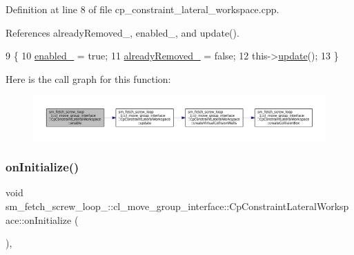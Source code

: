 Definition at line 8 of file cp\+\_\+constraint\+\_\+lateral\+\_\+workspace.\+cpp.



References already\+Removed\+\_\+, enabled\+\_\+, and update().


\begin{DoxyCode}
9         \{
10             \hyperlink{classsm__fetch__screw__loop__1_1_1cl__move__group__interface_1_1CpConstraintLateralWorkspace_a28b477967db7dd372abf9ab95675130e}{enabled\_} = \textcolor{keyword}{true};
11             \hyperlink{classsm__fetch__screw__loop__1_1_1cl__move__group__interface_1_1CpConstraintLateralWorkspace_a349bfead18a56cdbca6137926694e409}{alreadyRemoved\_} = \textcolor{keyword}{false};
12             this->\hyperlink{classsm__fetch__screw__loop__1_1_1cl__move__group__interface_1_1CpConstraintLateralWorkspace_a42a932b985fa0e4f9f48e52b363bf6c2}{update}();
13         \}
\end{DoxyCode}
Here is the call graph for this function\+:
\nopagebreak
\begin{figure}[H]
\begin{center}
\leavevmode
\includegraphics[width=350pt]{classsm__fetch__screw__loop__1_1_1cl__move__group__interface_1_1CpConstraintLateralWorkspace_a221dcce894e910dbfcbc58f80cacccdb_cgraph}
\end{center}
\end{figure}
\mbox{\label{classsm__fetch__screw__loop__1_1_1cl__move__group__interface_1_1CpConstraintLateralWorkspace_a6b1911a83059bef46803e9973fc325d8}} 
\subsubsection{\texorpdfstring{on\+Initialize()}{onInitialize()}}
{\footnotesize\ttfamily void sm\+\_\+fetch\+\_\+screw\+\_\+loop\+\_\+::cl\+\_\+move\+\_\+group\+\_\+interface\+::\+Cp\+Constraint\+Lateral\+Workspace\+::on\+Initialize (\begin{DoxyParamCaption}{ }\end{DoxyParamCaption})\hspace{0.3cm}{\ttfamily [override]}, {\ttfamily [virtual]}}




